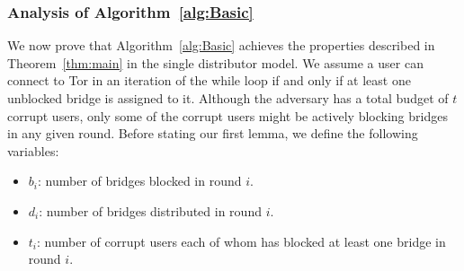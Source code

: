 \documentclass{sig-alternate-05-2015}
\begin{document}
\subsubsection{Analysis of Algorithm~\ref{alg:Basic}} \label{sec:ProofBasic}
We now prove that Algorithm~\ref{alg:Basic} achieves the properties described in Theorem~\ref{thm:main} in the single distributor model. 
We assume a user can connect to Tor in an iteration of the while loop if and only if at least one unblocked bridge is assigned to it. 
Although the adversary has a total budget of $t$ corrupt users, only some of the corrupt users might be actively blocking bridges in any given round. %
Before stating our first lemma, we define the following variables:
\begin{itemize}
	\item $b_i$: number of bridges blocked in round $i$.	
	\item $d_i$: number of bridges distributed in round $i$.
	\item $t_i$: number of corrupt users each of whom has blocked at least one bridge in round $i$.
\end{itemize}
\end{document}
